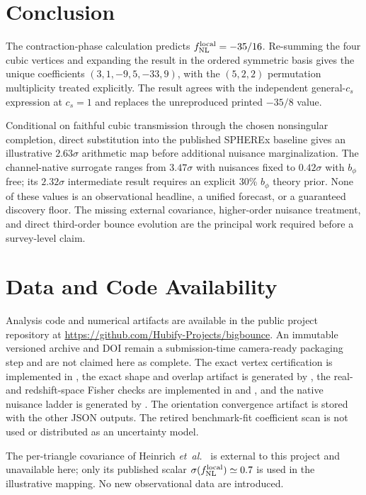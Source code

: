 \documentclass[aps,prd,twocolumn,superscriptaddress,showpacs,preprintnumbers,nofootinbib,longbibliography,floatfix]{revtex4-2}
\newcommand{\fnl}{f_{\rm NL}}
\newcommand{\etal}{\textit{et~al.}}
\begin{document}
\section{Conclusion}
\label{sec:conclusion}

The contraction-phase calculation predicts $\fnl^{\rm local}=-35/16$. Re-summing the four cubic vertices and expanding the result in the ordered symmetric basis gives the unique coefficients $(3,1,-9,5,-33,9)$, with the $(5,2,2)$ permutation multiplicity treated explicitly. The result agrees with the independent general-$c_s$ expression at $c_s=1$ and replaces the unreproduced printed $-35/8$ value.

Conditional on faithful cubic transmission through the chosen nonsingular completion, direct substitution into the published SPHEREx baseline gives an illustrative $2.63\sigma$ arithmetic map before additional nuisance marginalization. The channel-native surrogate ranges from $3.47\sigma$ with nuisances fixed to $0.42\sigma$ with $b_\phi$ free; its $2.32\sigma$ intermediate result requires an explicit 30\% $b_\phi$ theory prior. None of these values is an observational headline, a unified forecast, or a guaranteed discovery floor. The missing external covariance, higher-order nuisance treatment, and direct third-order bounce evolution are the principal work required before a survey-level claim.

\section*{Data and Code Availability}

Analysis code and numerical artifacts are available in the public project repository at \url{https://github.com/Hubify-Projects/bigbounce}. An immutable versioned archive and DOI remain a submission-time camera-ready packaging step and are not claimed here as complete. The exact vertex certification is implemented in , the exact shape and overlap artifact is generated by , the real- and redshift-space Fisher checks are implemented in  and , and the native nuisance ladder is generated by . The orientation convergence artifact is stored with the other JSON outputs. The retired benchmark-fit coefficient scan is not used or distributed as an uncertainty model.

The per-triangle covariance of Heinrich \etal~\cite{Heinrich:2023} is external to this project and unavailable here; only its published scalar $\sigma(\fnl^{\rm local})\simeq0.7$ is used in the illustrative mapping. No new observational data are introduced.
\appendix
\end{document}
